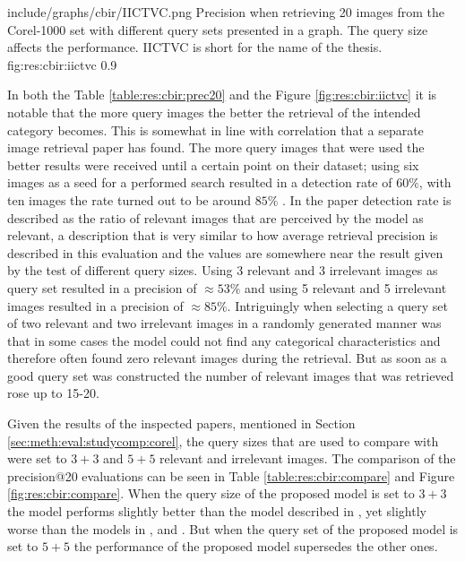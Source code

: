 \singlefigurenear
{include/graphs/cbir/IICTVC.png}
{Precision when retrieving 20 images from the Corel-1000 set with different query sets presented in a graph. The query size affects the performance. IICTVC is short for the name of the thesis.}
{fig:res:cbir:iictvc}
{0.9}

In both the Table \ref{table:res:cbir:prec20} and the Figure \ref{fig:res:cbir:iictvc} it is notable that the more query images the better the retrieval of the intended category becomes. This is somewhat in line with correlation that a separate image retrieval paper has found. The more query images that were used the better results were received until a certain point on their dataset; using six images as a seed for a performed search resulted in a detection rate of $60\%$, with ten images the rate turned out to be around $85\%$ \cite{li2010optimol}. In the paper detection rate is described as the ratio of relevant images that are perceived by the model as relevant, a description that is very similar to how average retrieval precision is described in this evaluation and the values are somewhere near the result given by the test of different query sizes. Using 3 relevant and 3 irrelevant images as query set resulted in a precision of $\approx53\%$ and using 5 relevant and 5 irrelevant images resulted in a precision of $\approx85\%$. Intriguingly when selecting a query set of two relevant and two irrelevant images in a randomly generated manner was that in some cases the model could not find any categorical characteristics and therefore often found zero relevant images during the retrieval. But as soon as a good query set was constructed the number of relevant images that was retrieved rose up to 15-20. 



Given the results of the inspected papers, mentioned in Section \ref{sec:meth:eval:studycomp:corel}, the query sizes that are used to compare with were set to $3+3$ and $5+5$ relevant and irrelevant images. The comparison of the precision@20 evaluations can be seen in Table \ref{table:res:cbir:compare} and Figure \ref{fig:res:cbir:compare}. When the query size of the proposed model is set to $3+3$ the model performs slightly better than the model described in \cite{wang2001simplicity}, yet slightly worse than the models in \cite{subrahmanyam2013modified}, \cite{nagaraja2015low} and \cite{elalami2014new}. But when the query set of the proposed model is set to $5+5$ the performance of the proposed model supersedes the other ones. 


